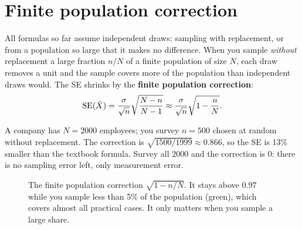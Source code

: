 \section{Finite population correction}
\label{sec:sd-fpc}

All formulas so far assume independent draws: sampling with replacement, or from a
population so large that it makes no difference. When you sample \emph{without}
replacement a large fraction $n/N$ of a finite population of size $N$, each draw
removes a unit and the sample covers more of the population than independent draws
would. The SE shrinks by the \textbf{finite population correction}:
\[
\operatorname{SE}(\bar{X})=\frac{\sigma}{\sqrt n}\sqrt{\frac{N-n}{N-1}}\approx\frac{\sigma}{\sqrt n}\sqrt{1-\frac nN}.
\]

\begin{example}
A company has $N=2000$ employees; you survey $n=500$ chosen at random without
replacement. The correction is $\sqrt{1500/1999}\approx 0.866$, so the SE is
13\% smaller than the textbook formula. Survey all 2000 and the correction is 0:
there is no sampling error left, only measurement error.
\end{example}

\begin{figure}[H]
\centering
{}
\caption{The finite population correction $\sqrt{1-n/N}$. It stays above $0.97$
while you sample less than 5\% of the population (green), which covers almost all
practical cases. It only matters when you sample a large share.}
\label{fig:sd-fpc}
\end{figure}

